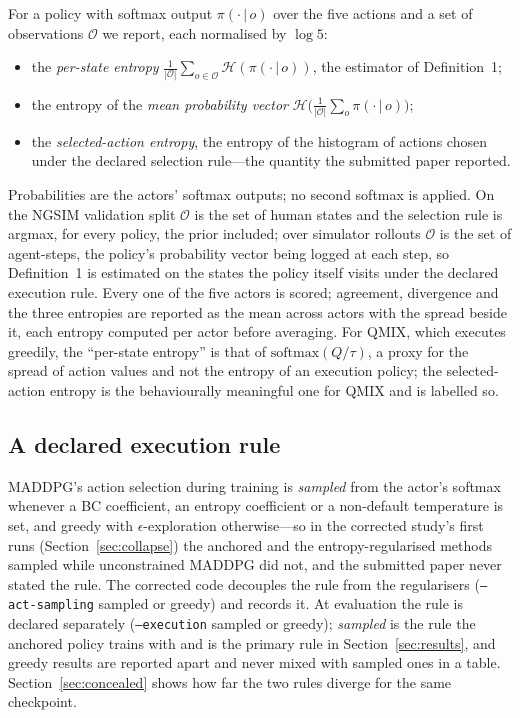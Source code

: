 For a policy with softmax output $\pi(\cdot\,|\,o)$ over the five actions and a set of observations $\mathcal{O}$ we report, each normalised by $\log 5$:
\begin{itemize}
  \item the \emph{per-state entropy} $\frac{1}{|\mathcal{O}|}\sum_{o\in\mathcal{O}} \mathcal{H}(\pi(\cdot\,|\,o))$, the estimator of Definition~1;
  \item the entropy of the \emph{mean probability vector} $\mathcal{H}\big(\frac{1}{|\mathcal{O}|}\sum_o \pi(\cdot\,|\,o)\big)$;
  \item the \emph{selected-action entropy}, the entropy of the histogram of actions chosen under the declared selection rule---the quantity the submitted paper reported.
\end{itemize}
Probabilities are the actors' softmax outputs; no second softmax is applied. On the NGSIM validation split $\mathcal{O}$ is the set of human states and the selection rule is argmax, for every policy, the prior included; over simulator rollouts $\mathcal{O}$ is the set of agent-steps, the policy's probability vector being logged at each step, so Definition~1 is estimated on the states the policy itself visits under the declared execution rule. Every one of the five actors is scored; agreement, divergence and the three entropies are reported as the mean across actors with the spread beside it, each entropy computed per actor before averaging. For QMIX, which executes greedily, the ``per-state entropy'' is that of $\mathrm{softmax}(Q/\tau)$, a proxy for the spread of action values and not the entropy of an execution policy; the selected-action entropy is the behaviourally meaningful one for QMIX and is labelled so.

\subsection{A declared execution rule}
\label{sec:contract_exec}

MADDPG's action selection during training is \emph{sampled} from the actor's softmax whenever a BC coefficient, an entropy coefficient or a non-default temperature is set, and greedy with $\epsilon$-exploration otherwise---so in the corrected study's first runs (Section~\ref{sec:collapse}) the anchored and the entropy-regularised methods sampled while unconstrained MADDPG did not, and the submitted paper never stated the rule. The corrected code decouples the rule from the regularisers (\texttt{--act-sampling} sampled or greedy) and records it. At evaluation the rule is declared separately (\texttt{--execution} sampled or greedy); \emph{sampled} is the rule the anchored policy trains with and is the primary rule in Section~\ref{sec:results}, and greedy results are reported apart and never mixed with sampled ones in a table. Section~\ref{sec:concealed} shows how far the two rules diverge for the same checkpoint.

